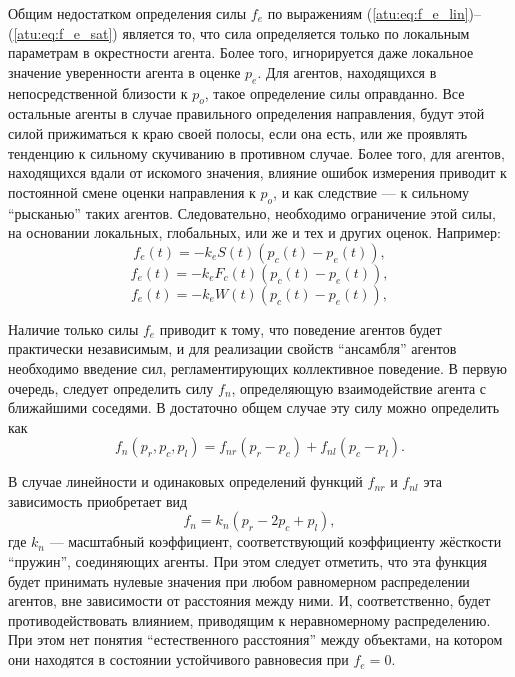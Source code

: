 Общим недостатком определения силы $f_e$ по выражениям
(\ref{atu:eq:f_e_lin})--(\ref{atu:eq:f_e_sat})
является то, что сила определяется только по локальным параметрам
в окрестности агента.
Более того, игнорируется даже локальное значение уверенности агента в оценке $p_e$.
Для агентов, находящихся в непосредственной близости к
$p_o$, такое определение силы оправданно. Все остальные агенты
в случае правильного определения направления, будут этой силой прижиматься
к краю своей полосы, если она есть, или же проявлять тенденцию
к сильному скучиванию в противном случае. Более того,
для агентов, находящихся вдали от искомого значения, влияние ошибок измерения
приводит к постоянной смене оценки направления к $p_o$, и как
следствие --- к сильному ``рысканью'' таких агентов.
Следовательно, необходимо ограничение этой силы,
на основании локальных, глобальных, или же и тех и других оценок.
Например:
%
\begin{equation}
  f_e(t) = - k_e S(t) \left( p_c(t) - p_e(t) \right) ,
  \label{atu:eq:f_e_lin_S}
\end{equation}
%
\begin{equation}
  f_e(t) = - k_e F_c(t) \left( p_c(t) - p_e(t) \right) ,
  \label{atu:eq:f_e_lin_F}
\end{equation}
%
\begin{equation}
  f_e(t) = - k_e W(t) \left( p_c(t) - p_e(t) \right) ,
  \label{atu:eq:f_e_lin_W}
\end{equation}


Наличие только силы $f_e$ приводит к тому, что поведение агентов
будет практически независимым, и для реализации свойств
``ансамбля'' агентов необходимо введение сил,
регламентирующих коллективное поведение.
В первую очередь, следует определить силу $f_n$,
определяющую взаимодействие агента с ближайшими соседями.
В достаточно общем случае эту силу можно определить как
%
\begin{equation}
  f_n( p_r, p_c, p_l ) = f_{nr}(p_r-p_c) + f_{nl}(p_c-p_l).
  \label{atu:eq:f_n_gen}
\end{equation}

В случае линейности и одинаковых определений функций $f_{nr}$ и $f_{nl}$
эта зависимость приобретает вид
%
\begin{equation}
  f_n = k_n ( p_r - 2 p_c + p_l ),
  \label{atu:eq:f_n_lin}
\end{equation}
%
где $k_n$ --- масштабный коэффициент, соответствующий
коэффициенту жёсткости ``пружин'', соединяющих агенты.
При этом следует отметить, что эта функция будет принимать нулевые значения
при любом равномерном распределении агентов, вне зависимости
от расстояния между ними. И, соответственно, будет
противодействовать влиянием, приводящим
к неравномерному распределению. При
этом нет понятия ``естественного расстояния''
между объектами, на котором они находятся в состоянии
устойчивого равновесия при $f_e = 0$.

